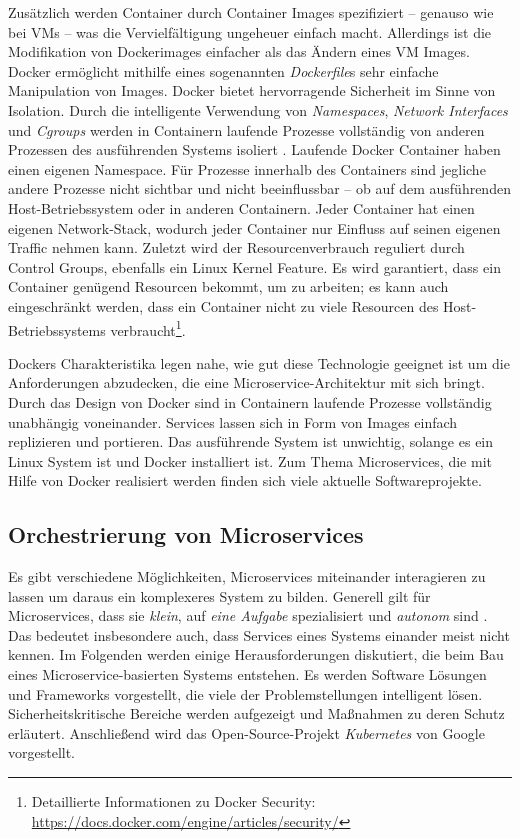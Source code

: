Zusätzlich werden Container durch Container Images spezifiziert -- genauso wie bei VMs -- was die Vervielfältigung ungeheuer einfach macht. Allerdings ist die Modifikation von Dockerimages einfacher als das Ändern eines VM Images. Docker ermöglicht mithilfe eines sogenannten \textit{Dockerfile}s sehr einfache Manipulation von Images. 
Docker bietet hervorragende Sicherheit im Sinne von Isolation. Durch die intelligente Verwendung von \textit{Namespaces}, \textit{Network Interfaces} und \textit{Cgroups} werden in Containern laufende Prozesse vollständig von anderen Prozessen des ausführenden Systems isoliert \cite{newman2015,marmol2015}. Laufende Docker Container haben einen eigenen Namespace. Für Prozesse innerhalb des Containers sind jegliche andere Prozesse nicht sichtbar und nicht beeinflussbar -- ob auf dem ausführenden Host-Betriebssystem oder in anderen Containern. Jeder Container hat einen eigenen Network-Stack, wodurch jeder Container nur Einfluss auf seinen eigenen Traffic nehmen kann. Zuletzt wird der Resourcenverbrauch reguliert durch Control Groups, ebenfalls ein Linux Kernel Feature. Es wird garantiert, dass ein Container genügend Resourcen bekommt, um zu arbeiten; es kann auch eingeschränkt werden, dass ein Container nicht zu viele Resourcen des Host-Betriebssystems verbraucht\footnote{Detaillierte Informationen zu Docker Security: \url{https://docs.docker.com/engine/articles/security/}}.

Dockers Charakteristika legen nahe, wie gut diese Technologie geeignet ist um die Anforderungen abzudecken, die eine Microservice-Architektur mit sich bringt. Durch das Design von Docker sind in Containern laufende Prozesse vollständig unabhängig voneinander. Services lassen sich in Form von Images einfach replizieren und portieren. Das ausführende System ist unwichtig, solange es ein Linux System ist und Docker installiert ist. Zum Thema Microservices, die mit Hilfe von Docker realisiert werden finden sich viele aktuelle Softwareprojekte.


\subsection{Orchestrierung von Microservices}

Es gibt verschiedene Möglichkeiten, Microservices miteinander interagieren zu lassen um daraus ein komplexeres System zu bilden. Generell gilt für Microservices, dass sie \textit{klein}, auf \textit{eine Aufgabe} spezialisiert und \textit{autonom} sind \cite{newman2015}. Das bedeutet insbesondere auch, dass Services eines Systems einander meist nicht kennen. Im Folgenden werden einige Herausforderungen diskutiert, die beim Bau eines Microservice-basierten Systems entstehen. Es werden Software Lösungen und Frameworks vorgestellt, die viele der Problemstellungen intelligent lösen. Sicherheitskritische Bereiche werden aufgezeigt und Maßnahmen zu deren Schutz erläutert. Anschließend wird das Open-Source-Projekt \textit{Kubernetes} von Google vorgestellt.

